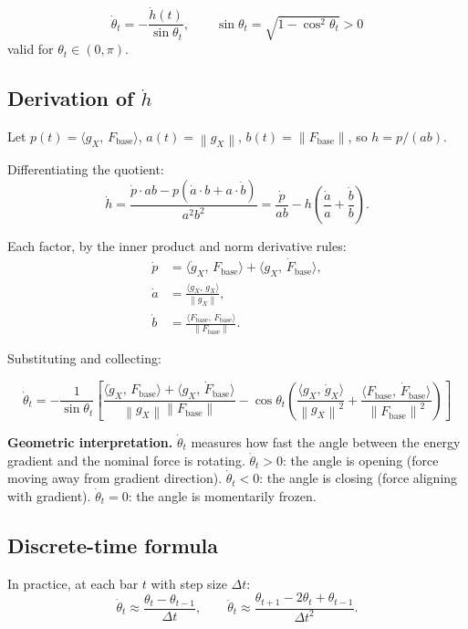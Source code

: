 \documentclass[11pt,a4paper]{article}
\theoremstyle{definition}
\newcommand{\norm}[1]{\left\|#1\right\|}
\newcommand{\inner}[2]{\langle #1,\,#2\rangle}
\newcommand{\Fbase}{F_{\mathrm{base}}}
\newcommand{\gX}{g_X}
\begin{document}
\begin{lockedbox}
\[
\dot\theta_t = -\frac{\dot h(t)}{\sin\theta_t}, \qquad \sin\theta_t = \sqrt{1 - \cos^2\theta_t} > 0
\]
valid for $\theta_t \in (0,\pi)$.
\end{lockedbox}

\subsection{Derivation of $\dot h$}

Let $p(t) = \inner{\gX}{\Fbase}$, $a(t) = \norm{\gX}$, $b(t) = \norm{\Fbase}$, so $h = p/(ab)$.

Differentiating the quotient:
\[
\dot h = \frac{\dot p \cdot ab - p(\dot a \cdot b + a \cdot \dot b)}{a^2 b^2}
= \frac{\dot p}{ab} - h\!\left(\frac{\dot a}{a} + \frac{\dot b}{b}\right).
\]

Each factor, by the inner product and norm derivative rules:
\begin{align*}
\dot p &= \inner{\dot\gX}{\Fbase} + \inner{\gX}{\dot \Fbase}, \\
\dot a &= \frac{\inner{\gX}{\dot\gX}}{\norm{\gX}}, \\
\dot b &= \frac{\inner{\Fbase}{\dot \Fbase}}{\norm{\Fbase}}.
\end{align*}

Substituting and collecting:

\begin{lockedbox}
\[
\dot\theta_t = -\frac{1}{\sin\theta_t}\!\left[
\frac{\inner{\dot\gX}{\Fbase} + \inner{\gX}{\dot \Fbase}}{\norm{\gX}\norm{\Fbase}}
- \cos\theta_t\!\left(
\frac{\inner{\gX}{\dot\gX}}{\norm{\gX}^2}
+ \frac{\inner{\Fbase}{\dot \Fbase}}{\norm{\Fbase}^2}
\right)\right]
\]
\end{lockedbox}

\textbf{Geometric interpretation.}
$\dot\theta_t$ measures how fast the angle between the energy gradient and the nominal force is rotating.
$\dot\theta_t > 0$: the angle is opening (force moving away from gradient direction).
$\dot\theta_t < 0$: the angle is closing (force aligning with gradient).
$\dot\theta_t = 0$: the angle is momentarily frozen.

\subsection{Discrete-time formula}

In practice, at each bar $t$ with step size $\Delta t$:
\[
\dot\theta_t \approx \frac{\theta_t - \theta_{t-1}}{\Delta t}, \qquad
\ddot\theta_t \approx \frac{\theta_{t+1} - 2\theta_t + \theta_{t-1}}{\Delta t^2}.
\]
\end{document}
